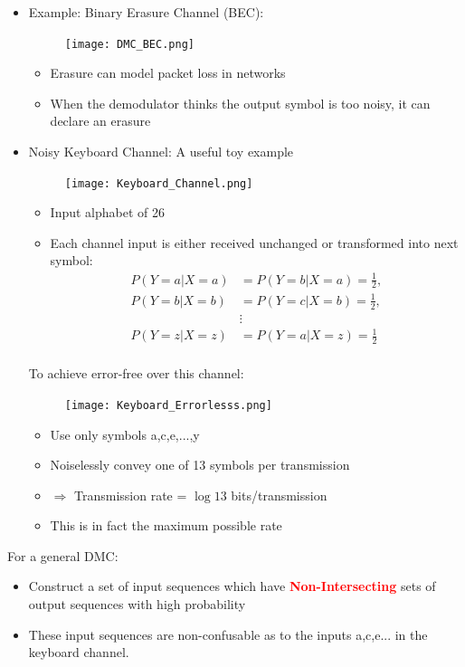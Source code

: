 \documentclass[12pt]{article}
\begin{document}
\begin{itemize}
    \item Example: Binary Erasure Channel (BEC):
    \begin{figure}[h]
    \centering
    \texttt{[image: DMC\_BEC.png]}
    \end{figure}
\begin{itemize}
    \item Erasure can model packet loss in networks
    \item When the demodulator thinks the output symbol is too noisy, it can declare an erasure
\end{itemize}
\item Noisy Keyboard Channel: A useful toy example 
\begin{figure}[h]
    \centering
    \texttt{[image: Keyboard\_Channel.png]}
\end{figure}
\begin{itemize}
    \item Input alphabet of 26
    \item Each channel input is either received unchanged or transformed into next symbol:
    \begin{align*}
        P(Y=a|X=a) &= P(Y=b|X=a) = \frac{1}{2}, \\
        P(Y=b|X=b) &= P(Y=c|X=b) = \frac{1}{2}, \\
        &\vdots \\
        P(Y=z|X=z) &= P(Y=a|X=z) = \frac{1}{2} \\
    \end{align*}
\end{itemize}
To achieve error-free over this channel:
\begin{figure}[h]
    \centering
    \texttt{[image: Keyboard\_Errorlesss.png]}
\end{figure}
\begin{itemize}
    \item Use only symbols a,c,e,...,y
    \item Noiselessly convey one of 13 symbols per transmission
    \item $\Longrightarrow$ Transmission rate = $\log 13$ bits/transmission
    \item This is in fact the maximum possible rate
\end{itemize}
\end{itemize}
For a general DMC:
\begin{itemize}
    \item Construct a set of input sequences which have \textcolor{red}{\textbf{Non-Intersecting }} sets of output sequences with high probability
    \item These input sequences are non-confusable as to the inputs a,c,e... in the keyboard channel.
\end{itemize}
\end{document}
